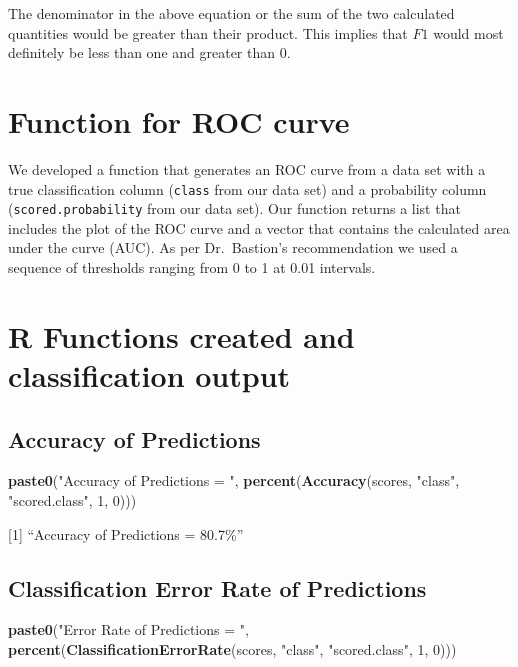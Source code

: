 \documentclass[]{article}
\newenvironment{Shaded}{\begin{snugshade}}{\end{snugshade}}
\newcommand{\KeywordTok}[1]{\textcolor[rgb]{0.13,0.29,0.53}{\textbf{{#1}}}}
\newcommand{\DecValTok}[1]{\textcolor[rgb]{0.00,0.00,0.81}{{#1}}}
\newcommand{\StringTok}[1]{\textcolor[rgb]{0.31,0.60,0.02}{{#1}}}
\newcommand{\NormalTok}[1]{{#1}}
\begin{document}
The denominator in the above equation or the sum of the two calculated
quantities would be greater than their product. This implies that \(F1\)
would most definitely be less than one and greater than 0.

\section{Function for ROC curve}\label{function-for-roc-curve}

We developed a function that generates an ROC curve from a data set with
a true classification column (\texttt{class} from our data set) and a
probability column (\texttt{scored.probability} from our data set). Our
function returns a list that includes the plot of the ROC curve and a
vector that contains the calculated area under the curve (AUC). As per
Dr.~Bastion's recommendation we used a sequence of thresholds ranging
from 0 to 1 at 0.01 intervals.

\newpage

\section{R Functions created and classification
output}\label{r-functions-created-and-classification-output}

\subsection{Accuracy of Predictions}\label{accuracy-of-predictions}

\begin{Shaded}
\begin{Highlighting}[]
\KeywordTok{paste0}\NormalTok{(}\StringTok{"Accuracy of Predictions = "}\NormalTok{, }\KeywordTok{percent}\NormalTok{(}\KeywordTok{Accuracy}\NormalTok{(scores, }\StringTok{"class"}\NormalTok{, }\StringTok{"scored.class"}\NormalTok{, }
    \DecValTok{1}\NormalTok{, }\DecValTok{0}\NormalTok{)))}
\end{Highlighting}
\end{Shaded}

{[}1{]} ``Accuracy of Predictions = 80.7\%''

\subsection{Classification Error Rate of
Predictions}\label{classification-error-rate-of-predictions}

\begin{Shaded}
\begin{Highlighting}[]
\KeywordTok{paste0}\NormalTok{(}\StringTok{"Error Rate of Predictions = "}\NormalTok{, }\KeywordTok{percent}\NormalTok{(}\KeywordTok{ClassificationErrorRate}\NormalTok{(scores, }
    \StringTok{"class"}\NormalTok{, }\StringTok{"scored.class"}\NormalTok{, }\DecValTok{1}\NormalTok{, }\DecValTok{0}\NormalTok{)))}
\end{Highlighting}
\end{Shaded}
\end{document}

